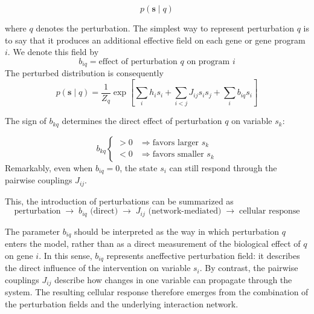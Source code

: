 \documentclass[11pt,a4paper]{article}
\begin{document}
\[
p(\bm{s}\mid q) 
\]

where $q$ denotes the perturbation. The simplest way to represent perturbation $q$ is to say that it produces an additional effective field on each gene or gene program $i$. We denote this field by
\[
b_{iq} =
\text{effect of perturbation }q\text{ on program }i
\]
The perturbed distribution is consequently
\[
	p(\bm{s}\mid q)
	=
	\frac{1}{Z_q}
	\exp
	\left[
	\sum_i h_i s_i
	+
	\sum_{i<j}J_{ij}s_is_j
	+
	\sum_i b_{iq}s_i
	\right]
\]


The sign of $b_{kq}$ determines the direct effect of perturbation $q$ on variable $s_k$:

\[
b_{kq}
\begin{cases}
>0 & \Rightarrow \text{favors larger }s_k\\
<0 & \Rightarrow \text{favors smaller }s_k
\end{cases}
\]
Remarkably, even when $b_{iq}=0$, the state $s_i$ can still respond through the pairwise couplings $J_{ij}$.

This, the introduction of perturbations can be summarized as
\[
\boxed{
	\text{perturbation}
	\;\rightarrow\;
	b_{iq}\text{ (direct)}
	\;\rightarrow\;
	J_{ij}\text{ (network-mediated)}
	\;\rightarrow\;
	\text{cellular response}
}
\]

%
%
%
%
%
%
%
%
%
%
%

The parameter $b_{iq}$ should be interpreted as the way in which perturbation $q$ enters the model, rather than as a direct measurement of the biological effect of $q$ on gene $i$. In this sense, $b_{iq}$ represents an{effective perturbation field}: it describes the direct influence of the intervention on variable $s_i$. By contrast, the pairwise couplings $J_{ij}$ describe how changes in one variable can propagate through the system. The resulting cellular response therefore emerges from the combination of the perturbation fields and the underlying interaction network.
\end{document}

